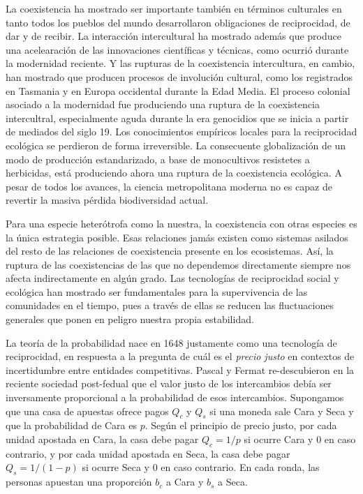 \documentclass[a4paper,10pt]{book}
\theoremstyle{definition}
\begin{document}
La coexistencia ha mostrado ser importante también en términos culturales en tanto todos los pueblos del mundo desarrollaron obligaciones de reciprocidad, de dar y de recibir.
%
La interacción intercultural ha mostrado además que produce una acelearación de las innovaciones científicas y técnicas, como ocurrió durante la modernidad reciente.
%
Y las rupturas de la coexistencia intercultura, en cambio, han mostrado que producen procesos de involución cultural, como los registrados en Tasmania y en Europa occidental durante la Edad Media.
%
El proceso colonial asociado a la modernidad fue produciendo una ruptura de la coexistencia intercultral, especialmente aguda durante la era genocidios que se inicia a partir de mediados del siglo 19.
% 
Los conocimientos empíricos locales para la reciprocidad ecológica se perdieron de forma irreversible.
%
La consecuente globalización de un modo de producción estandarizado, a base de monocultivos resistetes a herbicidas, está produciendo ahora una ruptura de la coexistencia ecológica.
%
A pesar de todos los avances, la ciencia metropolitana moderna no es capaz de revertir la masiva pérdida biodiversidad actual.


Para una especie heterótrofa como la nuestra, la coexistencia con otras especies es la única estrategia posible.
%
Esas relaciones jamás existen como sistemas asilados del resto de las relaciones de coexistencia presente en los ecosistemas.
%
Así, la ruptura de las coexistencias de las que no dependemos directamente siempre nos afecta indirectamente en algún grado.
%
Las tecnologías de reciprocidad social y ecológica han mostrado ser fundamentales para la supervivencia de las comunidades en el tiempo, pues a través de ellas se reducen las fluctuaciones generales que ponen en peligro nuestra propia estabilidad.


La teoría de la probabilidad nace en 1648 justamente como una tecnología de reciprocidad, en respuesta a la pregunta de cuál es el \emph{precio justo} en contextos de incertidumbre entre entidades competitivas.
%
Pascal y Fermat re-descubieron en la reciente sociedad post-fedual que el valor justo de los intercambios debía ser inversamente proporcional a la probabilidad de esos intercambios.
%
Supongamos que una casa de apuestas ofrece pagos $Q_c$ y $Q_s$ si una moneda sale Cara y Seca y que la probabilidad de Cara es $p$.
%
Según el principio de precio justo, por cada unidad apostada en Cara, la casa debe pagar $Q_c = 1/p$ si ocurre Cara y $0$ en caso contrario, y por cada unidad apostada en Seca, la casa debe pagar $Q_s = 1/(1-p)$ si ocurre Seca y $0$ en caso contrario.
%
En cada ronda, las personas apuestan una proporción $b_c$ a Cara y $b_s$ a Seca.
\end{document}
